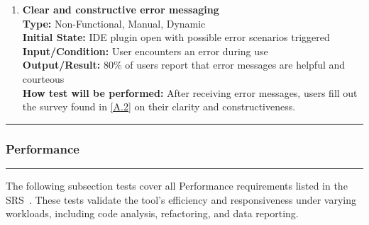 \documentclass[12pt, titlepage]{article}
\newcommand{\colorrule}{\textcolor{BlueViolet}{\rule{\linewidth}{2pt}}}
\begin{document}
\begin{enumerate}[label={\bf \textcolor{Maroon}{test-UH-\arabic*}},
    wide=0pt, font=\itshape]
    \item \textbf{Clear and constructive error messaging} \\[2mm]
      \textbf{Type:} Non-Functional, Manual, Dynamic \\
      \textbf{Initial State:} IDE plugin open with possible error
      scenarios triggered \\
      \textbf{Input/Condition:} User encounters an error during use \\
      \textbf{Output/Result:} 80\% of users report that error
      messages are helpful and courteous \\[2mm]
      \textbf{How test will be performed:} After receiving error
      messages, users fill out the survey found in \ref{A.2} on their
      clarity and constructiveness.
  \end{enumerate}

  \noindent
  \textcolor{Blue}{\colorrule}

  \subsubsection{Performance}
  \colorrule

  \medskip

  \noindent
  The following subsection tests cover all Performance requirements
  listed in the SRS~\cite{SRS}. These tests validate the tool’s
  efficiency and responsiveness under varying workloads, including
  code analysis, refactoring, and data reporting.
\end{document}
